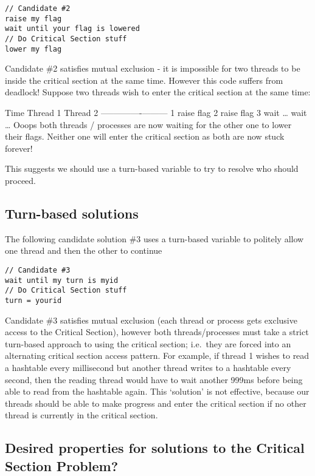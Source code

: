 \begin{verbatim}
// Candidate #2
raise my flag
wait until your flag is lowered
// Do Critical Section stuff
lower my flag 
\end{verbatim}

Candidate \#2 satisfies mutual exclusion - it is impossible for two
threads to be inside the critical section at the same time. However this
code suffers from deadlock! Suppose two threads wish to enter the
critical section at the same time:

Time \textbar{} Thread 1 \textbar{} Thread 2
-----\textbar{}----------\textbar{}--------- 1 \textbar{} raise flag 2
\textbar{} \textbar{} raise flag 3 \textbar{} wait \ldots{} \textbar{}
wait \ldots{} Ooops both threads / processes are now waiting for the
other one to lower their flags. Neither one will enter the critical
section as both are now stuck forever!

This suggests we should use a turn-based variable to try to resolve who
should proceed.

\subsection{Turn-based solutions}\label{turn-based-solutions}

The following candidate solution \#3 uses a turn-based variable to
politely allow one thread and then the other to continue

\begin{verbatim}
// Candidate #3
wait until my turn is myid
// Do Critical Section stuff
turn = yourid
\end{verbatim}

Candidate \#3 satisfies mutual exclusion (each thread or process gets
exclusive access to the Critical Section), however both
threads/processes must take a strict turn-based approach to using the
critical section; i.e.~they are forced into an alternating critical
section access pattern. For example, if thread 1 wishes to read a
hashtable every millisecond but another thread writes to a hashtable
every second, then the reading thread would have to wait another 999ms
before being able to read from the hashtable again. This `solution' is
not effective, because our threads should be able to make progress and
enter the critical section if no other thread is currently in the
critical section.

\subsection{Desired properties for solutions to the Critical Section
Problem?}\label{desired-properties-for-solutions-to-the-critical-section-problem}

